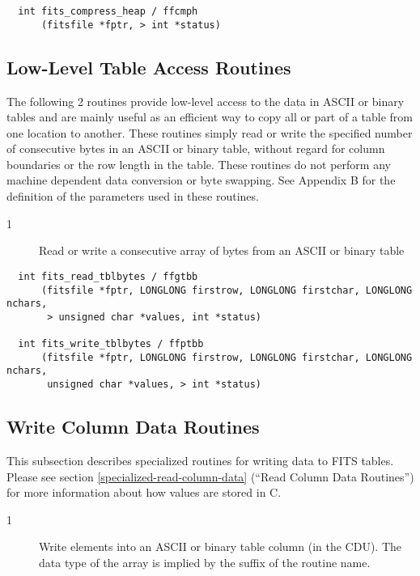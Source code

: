 \documentclass[11pt]{book}
\begin{document}
\begin{verbatim}
  int fits_compress_heap / ffcmph
      (fitsfile *fptr, > int *status)
\end{verbatim}


\subsection{Low-Level Table Access Routines}

The following 2 routines provide low-level access to the data in ASCII
or binary tables and are mainly useful as an efficient way to copy all
or part of a table from one location to another.  These routines simply
read or write the specified number of consecutive bytes in an ASCII or
binary table, without regard for column boundaries or the row length in
the table.  These routines do not perform any machine dependent data
conversion or byte swapping.  See Appendix B for the definition of the
parameters used in these routines.


\begin{description}
\item[1 ] Read or write a consecutive array of bytes from an ASCII or binary
   table \label{ffgtbb}  \label{ffptbb}
\end{description}

\begin{verbatim}
  int fits_read_tblbytes / ffgtbb
      (fitsfile *fptr, LONGLONG firstrow, LONGLONG firstchar, LONGLONG nchars,
       > unsigned char *values, int *status)

  int fits_write_tblbytes / ffptbb
      (fitsfile *fptr, LONGLONG firstrow, LONGLONG firstchar, LONGLONG nchars,
       unsigned char *values, > int *status)
\end{verbatim}


\subsection{Write Column Data Routines}

This subsection describes specialized routines for writing data to
FITS tables.  Please see section \ref{specialized-read-column-data}
(``Read Column Data Routines'') for more information about how values
are stored in C.

\begin{description}
\item[1 ] Write elements into an ASCII or binary table column (in the CDU).
    The data type of the array is implied by the suffix of the
   routine name.  \label{ffpcls}
\end{description}
\end{document}
